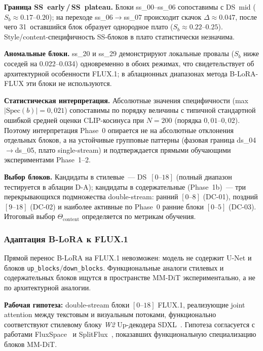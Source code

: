 \textbf{Граница SS~early\,/\,SS~plateau.} Блоки ss\_00--ss\_06 сопоставимы с DS~mid ($S_b\approx 0.17\text{--}0.20$); на переходе ss\_06$\to$ss\_07 происходит скачок $\Delta\approx 0.047$, после чего 31~оставшийся блок образует однородное плато ($S_b\approx 0.22\text{--}0.25$). Style/content-специфичность SS-блоков в плато статистически незначима.

\textbf{Аномальные блоки.} ss\_20 и ss\_29 демонстрируют локальные провалы ($S_b$ ниже соседей на 0.022--0.034) одновременно в обоих режимах, что свидетельствует об архитектурной особенности FLUX.1; в аблационных диапазонах метода B-LoRA-FLUX эти блоки не используются.

\textbf{Статистическая интерпретация.} Абсолютные значения специфичности (max $|\mathrm{Spec}(b)|{=}0{,}021$) сопоставимы по порядку величины с типичной стандартной ошибкой средней оценки CLIP-косинуса при $N{=}200$ (порядка $0{,}01$--$0{,}02$). Поэтому интерпретация Phase~0 опирается не на абсолютные отклонения отдельных блоков, а на устойчивые групповые паттерны (фазовая граница ds\_04$\to$ds\_05, плато single-stream) и подтверждается прямыми обучающими экспериментами Phase~1--2.

\textbf{Выбор блоков.} Кандидаты в стилевые~--- DS~$[0\text{--}18]$ (полный диапазон тестируется в аблации D-A); кандидаты в содержательные (Phase~1b)~--- три перекрывающихся подмножества double-stream: ранний $[0\text{--}8]$ (DC-01), поздний $[9\text{--}18]$ (DC-02) и наиболее активные по Phase~0 ранние блоки $[0\text{--}5]$ (DC-03). Итоговый выбор $\Theta_\text{content}$ определяется по метрикам обучения.

\subsubsection*{Адаптация B-LoRA к FLUX.1}

Прямой перенос B-LoRA на FLUX.1 невозможен: модель не содержит U-Net и блоков \texttt{up\_blocks}/\texttt{down\_blocks}. Функциональные аналоги стилевых и содержательных блоков ищутся в пространстве MM-DiT экспериментально, а не по архитектурной аналогии.

\textbf{Рабочая гипотеза:} double-stream блоки $[0\text{--}18]$ FLUX.1, реализующие joint attention между текстовым и визуальным потоками, функционально соответствуют стилевому блоку \textit{W2} Up-декодера SDXL~\cite{frenkel2024blora}. Гипотеза согласуется с работами FluxSpace~\cite{dalva2024fluxspace} и SplitFlux~\cite{yang2025splitflux}, показавших функциональную специализацию блоков MM-DiT.


